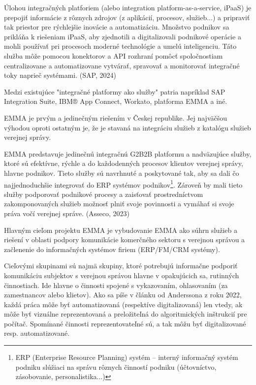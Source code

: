 


Úlohou integračných platforiem (alebo integration platform-as-a-service, \zlom iPaaS) je prepojiť informácie z rôznych zdrojov (z aplikácií, procesov, služieb...) a pripraviť tak priestor pre rýchlejšie inovácie a automatizáciu. Množstvo podnikov sa prikláňa k riešeniam iPaaS, aby zjednotili a digitalizovali podnikové operácie a mohli používať pri procesoch moderné technológie a umelú inteligenciu. Táto služba môže pomocou konektorov a API rozhraní pomôcť spoločnostiam centralizovane a automatizovane vytvárať, spravovať a monitorovať integračné toky naprieč systémami. \scr(SAP, 2024)

Medzi existujúce "integračné platformy ako služby" patria napríklad SAP Integration Suite, IBM® App Connect, Workato, platforma EMMA a iné.

EMMA je prvým a jedinečným riešením v Českej republike. Jej najväčšou výhodou oproti ostatným je, že je stavaná na integráciu služieb z katalógu služieb verejnej správy.

EMMA predstavuje jedinečnú integračnú G2B2B platformu a nadväzujúce služby, ktoré sú efektívne, rýchle a  do každodenných procesov klientov verejnej správy, hlavne podnikov. Tieto služby sú navrhnuté a poskytované tak, aby sa dali čo najjednoduchšie integrovať do ERP systémov podnikov\footnote{ERP (Enterprise Resource Planning) systém -- interný informačný systém podniku slúžiaci na správu rôznych činností podniku (účtovníctvo, zásobovanie, personalistika...)}. Zároveň by mali tieto služby podporovať podnikové procesy a zaisťovať prostredníctvom zakomponovaných služieb možnosť plniť svoje povinnosti a vymáhať si svoje práva vočí verejnej správe. \scr(Asseco, 2023)

Hlavným cieľom projektu EMMA je vybudovanie EMMA ako súhrn služieb a riešení v oblasti podpory komunikácie komerčného sektoru s verejnou správou a začlenenie do informačných systémov firiem (ERP/FM/CRM systémy).

Cieľovými skupinami sú najmä skupiny, ktoré potrebujú informačne podporiť komunikáciu subjektov s verejnou správou hlavne v opakujúcich sa, rutinných činnostiach.  Ide hlavne o činnosti spojené s vykazovaním, ohlasovaním (za zamestnancov alebo klietov). Ako sa píše v článku od Anderssona z roku 2022, každá práca môže byť automatizovaná (respektíve digitalizovaná) len vtedy, ak môže byť vizuálne reprezentovaná a preložiteľná do algoritmických inštrukcií pre počítač. Spomínané činnosti reprezentovateľné sú, a tak môžu byť digitalizované resp. automatizované.

